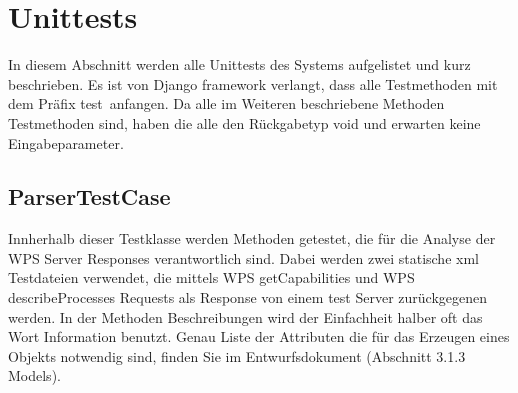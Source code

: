 \chapter{Unittests}
    \begin{flushleft}
    In diesem Abschnitt werden alle Unittests des Systems aufgelistet und kurz beschrieben. \newline
    Es ist von Django framework verlangt, dass alle Testmethoden mit dem Präfix \glqq test\grqq \ anfangen. \newline 
    Da alle im Weiteren beschriebene Methoden Testmethoden sind, haben die alle den Rückgabetyp void und erwarten keine Eingabeparameter.  
    \end{flushleft}
    
    \section{ParserTestCase}
    
    \begin{flushleft}
    Innherhalb dieser Testklasse werden Methoden getestet, die für die Analyse der WPS Server Responses verantwortlich sind. Dabei werden zwei statische xml Testdateien verwendet, die mittels WPS getCapabilities und WPS describeProcesses Requests als Response von einem test Server zurückgegenen werden. \newline
    In der Methoden Beschreibungen wird der Einfachheit halber oft das Wort \glqq Information \grqq benutzt. Genau Liste der Attributen die für das Erzeugen eines Objekts notwendig sind, finden Sie im Entwurfsdokument (Abschnitt 3.1.3 Models).
    \end{flushleft}
	
